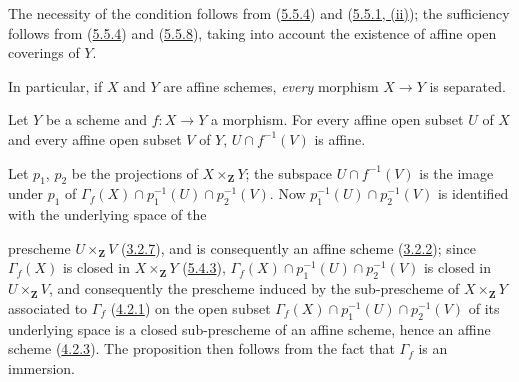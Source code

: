 The necessity of the condition follows from
(\hyperref[I.5.5.4]{5.5.4}) and
(\hyperref[I.5.5.1]{5.5.1, (ii)}); the sufficiency follows from
(\hyperref[I.5.5.4]{5.5.4}) and
(\hyperref[I.5.5.8]{5.5.8}), taking into account the existence of affine
open coverings of $Y$.

In particular, if $X$ and $Y$ are affine schemes, \emph{every} morphism
$X\to Y$ is separated.

\begin{proposition}[5.5.10]
\label{I.5.5.10}
Let $Y$ be a scheme and $f:X\to Y$ a morphism. For every affine open subset
$U$ of $X$ and every affine open subset $V$ of $Y$, $U\cap f^{-1}(V)$ is
affine.
\end{proposition}

Let $p_1$, $p_2$ be the projections of $X\times_{\mathbf{Z}}Y$; the
subspace $U\cap f^{-1}(V)$ is the image under $p_1$ of
$\Gamma_f(X)\cap p_1^{-1}(U)\cap p_2^{-1}(V)$. Now
$p_1^{-1}(U)\cap p_2^{-1}(V)$ is identified with the underlying space of the

prescheme $U\times_{\mathbf{Z}}V$
(\hyperref[I.3.2.7]{3.2.7}), and is consequently an affine scheme
(\hyperref[I.3.2.2]{3.2.2}); since $\Gamma_f(X)$ is closed in
$X\times_{\mathbf{Z}}Y$ (\hyperref[I.5.4.3]{5.4.3}),
$\Gamma_f(X)\cap p_1^{-1}(U)\cap p_2^{-1}(V)$ is closed in
$U\times_{\mathbf{Z}}V$, and consequently the prescheme induced by the
sub-prescheme of $X\times_{\mathbf{Z}}Y$ associated to $\Gamma_f$
(\hyperref[I.4.2.1]{4.2.1}) on the open subset
$\Gamma_f(X)\cap p_1^{-1}(U)\cap p_2^{-1}(V)$ of its underlying space is
a closed sub-prescheme of an affine scheme, hence an affine scheme
(\hyperref[I.4.2.3]{4.2.3}). The proposition then follows from the fact
that $\Gamma_f$ is an immersion.

